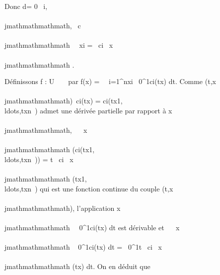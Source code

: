 Donc d\omega = 0 \Leftrightarrow
\forall~i,\\\\jmathmathmathmath, \partial~c\\\\jmathmathmathmath~ \over
\partial~xi = \partial~ci \over \partial~x\\\\jmathmathmathmath .

Définissons f : U \rightarrow~ ~ par f(x) =\
\sum ~
i=1^nxi\int ~
0^1ci(tx) dt. Comme
(t,x\\\\jmathmathmathmath)\mapsto~ci(tx) =
ci(tx1,\\ldots,txn~)
admet une dérivée partielle par rapport à x\\\\jmathmathmathmath,  \partial~
\over \partial~x\\\\jmathmathmathmath
(ci(tx1,\\ldots,txn~))
= t \partial~ci \over \partial~x\\\\jmathmathmathmath
(tx1,\\ldots,txn~)
qui est une fonction continue du couple (t,x\\\\jmathmathmathmath), l'application
x\\\\jmathmathmathmath\mapsto~\int ~
0^1ci(tx) dt est dérivable et  \partial~
\over \partial~x\\\\jmathmathmathmath \int ~
0^1ci(tx) dt =\int ~
0^1t \partial~ci \over \partial~x\\\\jmathmathmathmath
(tx) dt. On en déduit que

